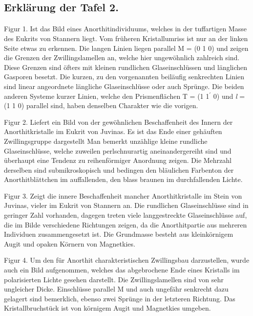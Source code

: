 \documentclass[a4paper, 11pt, oneside, polutonikogreek, german]{article}
\begin{document}
\subsection{Erklärung der Tafel 2.}
\paragraph{}
Figur 1. Ist das Bild eines Anorthitindividuums, welches in der tuffartigen Masse des Eukrits von Stannern liegt. Vom früheren Kristallumriss ist nur an der linken Seite etwas zu erkennen. Die langen Linien liegen parallel M = (0 1 0) und zeigen die Grenzen der Zwillingslamellen an, welche hier ungewöhnlich zahlreich sind. Diese Grenzen sind öfters mit kleinen rundlichen Glaseinschlüssen und länglichen Gasporen besetzt. Die kurzen, zu den vorgenannten beiläufig senkrechten Linien sind linear angeordnete längliche Glaseinschlüsse oder auch Sprünge. Die beiden anderen Systeme kurzer Linien, welche den Prismenflächen T = (1 1$^{\prime}$ 0) und \emph{l} = (1 1 0) parallel sind, haben denselben Charakter wie die vorigen.

Figur 2. Liefert ein Bild von der gewöhnlichen Beschaffenheit des Innern der Anorthitkristalle im Eukrit von Juvinas. Es ist das Ende einer gehäuften Zwillingsgruppe dargestellt Man bemerkt unzählige kleine rundliche Glaseinschlüsse, welche zuweilen perlschnurartig aneinandergereiht sind und überhaupt eine Tendenz zu reihenförmiger Anordnung zeigen. Die Mehrzahl derselben sind submikroskopisch und bedingen den bläulichen Farbenton der Anorthitblättchen im auffallenden, den blass braunen im durchfallenden Lichte.

Figur 3. Zeigt die innere Beschaffenheit mancher Anorthitkristalle im Stein von Juvinas, vieler im Eukrit von Stannern an. Die rundlichen Glaseinschlüsse sind in geringer Zahl vorhanden, dagegen treten viele langgestreckte Glaseinschlüsse auf, die im Bilde verschiedene Richtungen zeigen, da die Anorthitpartie aus mehreren Individuen zusammengesetzt ist. Die Grundmasse besteht aus kleinkörnigem Augit und opaken Körnern von Magnetkies.

Figur 4. Um den für Anorthit charakteristischen Zwillingsbau darzustellen, wurde auch ein Bild aufgenommen, welches das abgebrochene Ende eines Kristalls im polarisierten Lichte gesehen darstellt. Die Zwillingslamellen sind von sehr ungleicher Dicke. Einschlüsse parallel M und auch ungefähr senkrecht dazu gelagert sind bemerklich, ebenso zwei Sprünge in der letzteren Richtung. Das Kristallbruchstück ist von körnigem Augit und Magnetkies umgeben.
\clearpage
\end{document}
